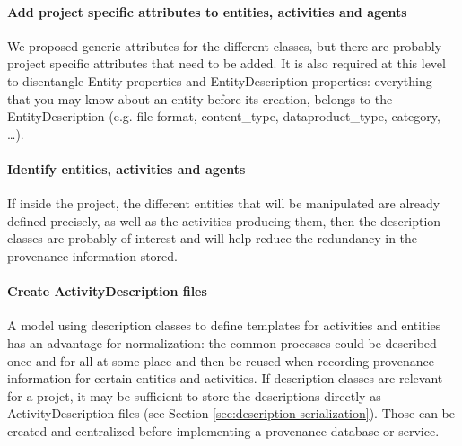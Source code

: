 \paragraph{Add project specific attributes to entities, activities and agents}
We proposed generic attributes for the different classes, but there are probably project specific attributes that need to be added. 
It is also required at this level to disentangle Entity properties and EntityDescription properties: everything that you may know about an entity before its creation, belongs to the EntityDescription (e.g. file format, content\_type, dataproduct\_type, category, \dots).

\paragraph{Identify entities, activities and agents}
If inside the project, the different entities that will be manipulated are already defined precisely, as well as the activities producing them, then the description classes are probably of interest and will help reduce
 the redundancy in the provenance information stored. 

\paragraph{Create ActivityDescription files}
A model using description classes to define templates for activities and
entities has an advantage for normalization: the common processes could be
described once and for all at some place and then be reused when recording
provenance information for certain entities and activities.
If description classes are relevant for a projet, it may be sufficient to store the descriptions directly as ActivityDescription files (see Section \ref{sec:description-serialization}). 
Those can be created and centralized before implementing a provenance database or service.

